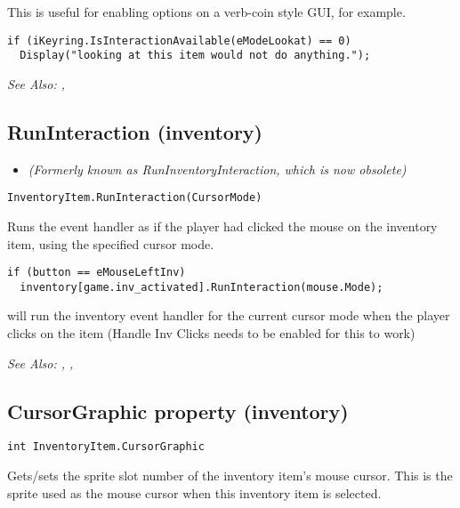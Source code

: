 This is useful for enabling options on a verb-coin style GUI, for example.

\begin{verbatim}
if (iKeyring.IsInteractionAvailable(eModeLookat) == 0)
  Display("looking at this item would not do anything.");
\end{verbatim}

\it{See Also:} ,


\subsection{RunInteraction (inventory)}\label{InventoryItem.RunInteraction}%

\begin{itemize}
\item \it{(Formerly known as RunInventoryInteraction, which is now obsolete)}
\end{itemize}

\begin{verbatim}
InventoryItem.RunInteraction(CursorMode)
\end{verbatim}
Runs the event handler as if the player had clicked the mouse
on the inventory item, using the specified cursor mode.

\begin{verbatim}
if (button == eMouseLeftInv)
  inventory[game.inv_activated].RunInteraction(mouse.Mode);
\end{verbatim}
will run the inventory event handler for the current cursor mode when the player clicks
on the item (Handle Inv Clicks needs to be enabled for this to work)

\it{See Also:} ,
, 


\subsection{CursorGraphic property (inventory)}\label{InventoryItem.CursorGraphic}%

\begin{verbatim}
int InventoryItem.CursorGraphic
\end{verbatim}
Gets/sets the sprite slot number of the inventory item's mouse cursor. This is
the sprite used as the mouse cursor when this inventory item is selected.

